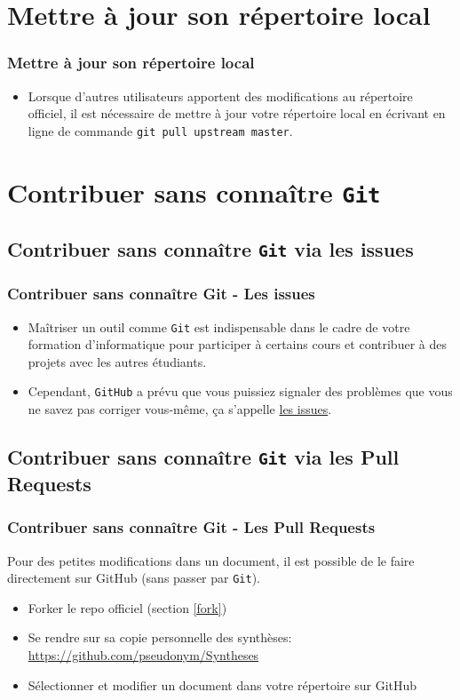 \documentclass{beamer}
\begin{document}
\section{Mettre à jour son répertoire local}

\begin{frame}
    \frametitle{Mettre à jour son répertoire local}
    \begin{itemize}
        \item Lorsque d'autres utilisateurs apportent des modifications au répertoire officiel, il est nécessaire de mettre à jour votre répertoire local en écrivant en ligne de commande \lstinline[mathescape]|git pull upstream master|.
    \end{itemize}
\end{frame}

\section{Contribuer sans connaître \texttt{Git}}

\subsection{Contribuer sans connaître \texttt{Git} via les issues}

\begin{frame}
    \frametitle{Contribuer sans connaître Git - Les issues}
    \begin{itemize}
        \item Ma\^itriser un outil comme \lstinline|Git| est indispensable dans le
            cadre de votre formation d'informatique pour participer à
            certains cours et contribuer à des projets avec les autres
            étudiants.
        \item Cependant, \lstinline|GitHub| a prévu que vous puissiez signaler des
            problèmes que vous ne savez pas corriger vous-même, ça
            s'appelle \href{https://github.com/Gp2mv3/Syntheses/issues}{les issues}.
    \end{itemize}
\end{frame}

\subsection{Contribuer sans connaître \texttt{Git} via les Pull Requests}

\begin{frame}
    \frametitle{Contribuer sans connaître Git - Les Pull Requests}
    Pour des petites modifications dans un document, il est possible de le faire directement sur GitHub (sans passer par \lstinline|Git|).
    \begin{itemize}
        \item Forker le repo officiel (section \ref{fork})
        \item Se rendre sur sa copie personnelle des synthèses: \url{https://github.com/pseudonym/Syntheses}
        \item Sélectionner et modifier un document dans votre répertoire sur GitHub
    \end{itemize}
\end{frame}
\end{document}
